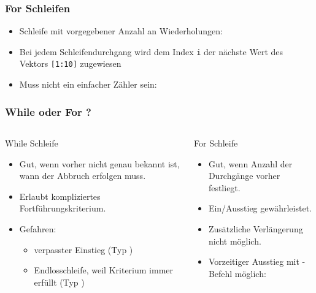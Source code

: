       \begin{frame}
          \frametitle{For Schleifen}
          \begin{itemize}
            \item Schleife mit vorgegebener Anzahl an Wiederholungen:
            
            \item Bei jedem Schleifendurchgang wird dem Index \texttt{i} der nächste Wert des Vektors \texttt{[1:10]} zugewiesen
            \item Muss nicht  ein einfacher Zähler sein:
            
          \end{itemize}
      \end{frame}

      \begin{frame}
          \frametitle{While oder For ?}
          \begin{columns}[t]
            \begin{column}{5cm}
              While Schleife
              \begin{itemize}
                \item Gut, wenn vorher nicht genau bekannt ist, wann der Abbruch erfolgen muss.
                \item Erlaubt kompliziertes Fortführungskriterium.
                \item \alert{Gefahren}:
                \begin{itemize}
                  \item verpasster Einstieg (Typ )
                  \item Endlosschleife, weil Kriterium immer erfüllt (Typ )
                \end{itemize}
              \end{itemize}
            \end{column}

            \begin{column}{6cm}
              For Schleife
              \begin{itemize}
                \item Gut, wenn Anzahl der Durchgänge vorher festliegt.
                \item Ein/Ausstieg gewährleistet.
                \item Zusätzliche Verlängerung nicht möglich.
                \item Vorzeitiger Ausstieg mit -Befehl möglich:
                
              \end{itemize}
            \end{column}
          \end{columns}
      \end{frame}

